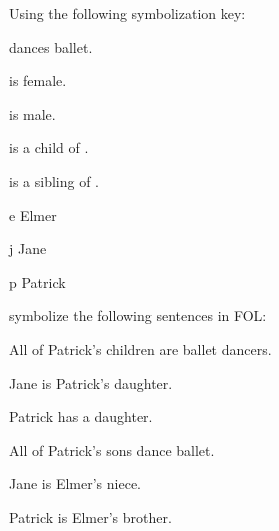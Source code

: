 \begin{practiceproblems}
	\solutions
	\problempart
	\label{pr:FOLballet}
	Using the following symbolization key:
	\begin{ekey}
		\item[\atom{D}{x}]  dances ballet.
		\item[\atom{F}{x}]  is female.
		\item[\atom{M}{x}]  is male.
		\item[\atom{C}{x,y}]  is a child of .
		\item[\atom{S}{x,y}]  is a sibling of .
		\item[e] Elmer
		\item[j] Jane
		\item[p] Patrick
	\end{ekey}
	symbolize the following sentences in FOL:
	\begin{problemslist}
		\item All of Patrick's children are ballet dancers.
		\item[] 
		\item Jane is Patrick's daughter.
		\item[] 
		\item Patrick has a daughter.
		\item[] 
		\item All of Patrick's sons dance ballet.
		\item[] 
		\item Jane is Elmer's niece.
		\item[] 
		\item Patrick is Elmer's brother.
		\item[] 

\end{problemslist}
\end{practiceproblems}
